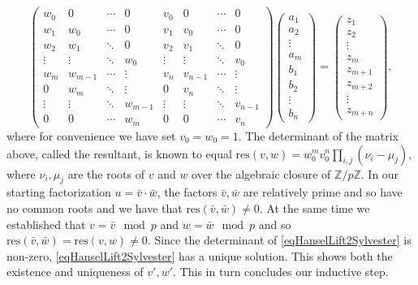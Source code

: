 \documentclass{article}
\begin{document}
\begin{equation}\label{eqHanselLift2Sylvester}
\left( \begin{array}{ccccccccccc}
w_0      & 0           & \cdots & 0          & v_0        & 0              & \cdots & 0       \\
w_1    & w_0       & \cdots & 0           & v_1     & v_0           & \cdots & 0  \\
w_2    & w_1     & \ddots & 0           & v_2     & v_1         & \ddots & 0 \\
\vdots  &\vdots   & \ddots & w_0        & \vdots   &\vdots       & \ddots & v_0  \\
w_m       & w_{m-1} & \cdots & \vdots   & v_n       & v_{n-1}     & \cdots & \vdots\\
0          & w_m       & \ddots &  \vdots  & 0          & v_n          & \ddots &  \vdots  \\
\vdots  & \vdots   & \ddots & w_{m-1}  & \vdots  & \vdots      & \ddots & v_{n-1}   \\
0          & 0          & \cdots  & w_m       & 0           & 0              & \cdots & v_n   

\end{array}\right) \begin{pmatrix}
a_1 \\
a_2\\
\vdots\\
a_m\\
b_1\\
b_2\\
\vdots \\
b_n
\end{pmatrix} = \begin{pmatrix}
z_1\\
z_2\\
\vdots
\\ 
z_m\\
z_{m+1} \\
z_{m+2} \\
\vdots \\
z_{m+n}

\end{pmatrix},
\end{equation}
where for convenience we have set $v_0 = w_0=1$. The determinant of the matrix above, called the resultant, is known to equal \(\text{res}(v,w) = \displaystyle w_0^mv_0^n\prod_{i, j} \left(\nu_i-\mu_j \right)\), where $\nu_i, \mu_j$ are the roots of $v$ and $w$ over the algebraic closure of $\mathbb Z / p\mathbb Z$. In our starting factorization $u=\bar v\cdot \bar w $, the factors $\bar v, \bar w$ are relatively prime and so have no common roots and we have that $\text{res}(\bar v, \bar w)\neq 0$. At the same time we established that $v =\bar v \mod p$ and $w=\bar w\mod p $ and so $\text{res} (\bar v, \bar w) = \text{res}(v,w) \neq 0$. Since the determinant of \eqref{eqHanselLift2Sylvester} is non-zero, \eqref{eqHanselLift2Sylvester} has a unique solution. This shows both the existence and uniqueness of $v',w'$. This in turn concludes our inductive step.
\end{document}
